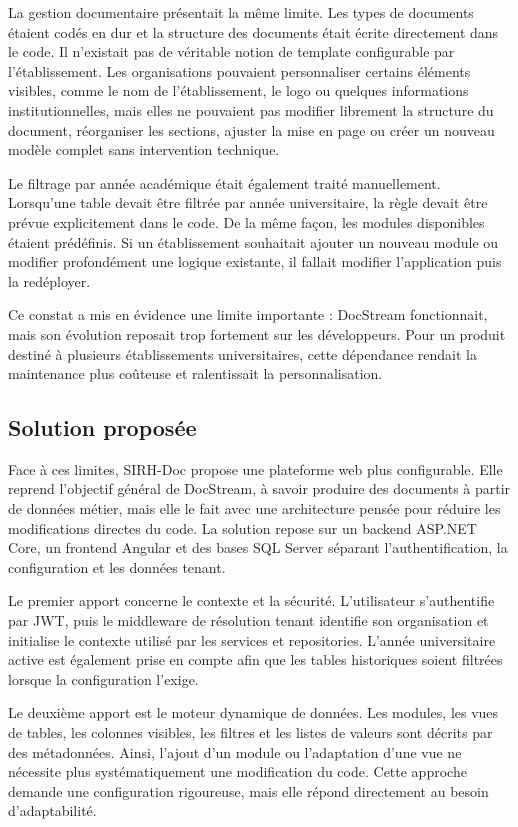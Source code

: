 La gestion documentaire présentait la même limite. Les types de documents étaient codés en dur et la structure des documents était écrite directement dans le code. Il n'existait pas de véritable notion de template configurable par l'établissement. Les organisations pouvaient personnaliser certains éléments visibles, comme le nom de l'établissement, le logo ou quelques informations institutionnelles, mais elles ne pouvaient pas modifier librement la structure du document, réorganiser les sections, ajuster la mise en page ou créer un nouveau modèle complet sans intervention technique.

Le filtrage par année académique était également traité manuellement. Lorsqu'une table devait être filtrée par année universitaire, la règle devait être prévue explicitement dans le code. De la même façon, les modules disponibles étaient prédéfinis. Si un établissement souhaitait ajouter un nouveau module ou modifier profondément une logique existante, il fallait modifier l'application puis la redéployer.

Ce constat a mis en évidence une limite importante : DocStream fonctionnait, mais son évolution reposait trop fortement sur les développeurs. Pour un produit destiné à plusieurs établissements universitaires, cette dépendance rendait la maintenance plus coûteuse et ralentissait la personnalisation.

\subsection{Solution proposée}

Face à ces limites, SIRH-Doc propose une plateforme web plus configurable. Elle reprend l'objectif général de DocStream, à savoir produire des documents à partir de données métier, mais elle le fait avec une architecture pensée pour réduire les modifications directes du code. La solution repose sur un backend ASP.NET Core, un frontend Angular et des bases SQL Server séparant l'authentification, la configuration et les données tenant.

Le premier apport concerne le contexte et la sécurité. L'utilisateur s'authentifie par JWT, puis le middleware de résolution tenant identifie son organisation et initialise le contexte utilisé par les services et repositories. L'année universitaire active est également prise en compte afin que les tables historiques soient filtrées lorsque la configuration l'exige.

Le deuxième apport est le moteur dynamique de données. Les modules, les vues de tables, les colonnes visibles, les filtres et les listes de valeurs sont décrits par des métadonnées. Ainsi, l'ajout d'un module ou l'adaptation d'une vue ne nécessite plus systématiquement une modification du code. Cette approche demande une configuration rigoureuse, mais elle répond directement au besoin d'adaptabilité.

